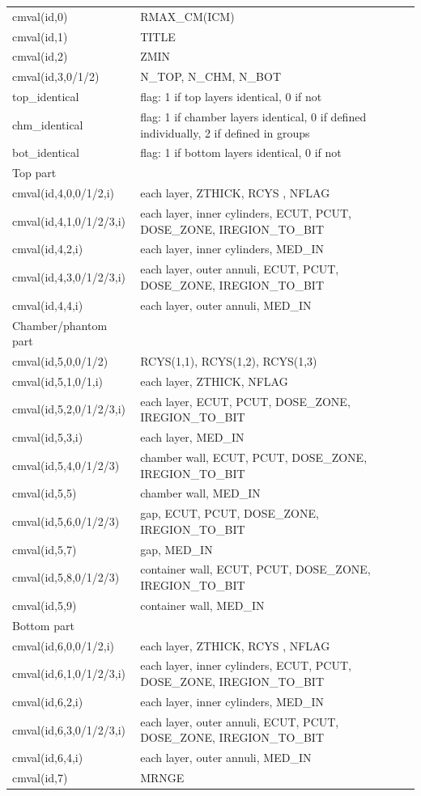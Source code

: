 \documentclass[12pt]{book}
\begin{document}
\begin{tabular}{|p{4.5cm}|p{11.5cm}|}\hline
cmval(id,0) & RMAX\_CM(ICM)\\
cmval(id,1)   & TITLE\\
cmval(id,2)    &ZMIN    \\
cmval(id,3,0/1/2)    &N\_TOP, N\_CHM, N\_BOT \\
top\_identical & flag: 1 if top layers identical, 0 if not\\
chm\_identical & flag: 1 if chamber layers identical, 0 if defined
individually, 2 if defined in groups\\
bot\_identical & flag: 1 if bottom layers identical, 0 if not\\
\hline Top part     & \\ \hline
cmval(id,4,0,0/1/2,i)   &each layer, ZTHICK, RCYS , NFLAG \\
cmval(id,4,1,0/1/2/3,i)   & each layer, inner cylinders,
ECUT, PCUT, DOSE\_ZONE, IREGION\_TO\_BIT\\
cmval(id,4,2,i)   &each layer, inner cylinders, MED\_IN\\
cmval(id,4,3,0/1/2/3,i)   &
each layer, outer annuli, ECUT, PCUT, DOSE\_ZONE, IREGION\_TO\_BIT\\
cmval(id,4,4,i)   &each layer, outer annuli, MED\_IN\\
\hline Chamber/phantom part  & \\ \hline
cmval(id,5,0,0/1/2) &  RCYS(1,1), RCYS(1,2), RCYS(1,3)\\
cmval(id,5,1,0/1,i)   &each layer, ZTHICK, NFLAG\\
cmval(id,5,2,0/1/2/3,i) &
each layer, ECUT, PCUT, DOSE\_ZONE, IREGION\_TO\_BIT\\
cmval(id,5,3,i)   &each layer, MED\_IN \\
cmval(id,5,4,0/1/2/3)   &
chamber wall, ECUT, PCUT, DOSE\_ZONE, IREGION\_TO\_BIT\\
cmval(id,5,5)   &chamber wall, MED\_IN  \\
cmval(id,5,6,0/1/2/3)   & gap, ECUT, PCUT, DOSE\_ZONE, IREGION\_TO\_BIT\\
cmval(id,5,7)   &gap, MED\_IN  \\
cmval(id,5,8,0/1/2/3)   &
container wall, ECUT, PCUT, DOSE\_ZONE, IREGION\_TO\_BIT\\
cmval(id,5,9)   &container wall, MED\_IN\\
\hline Bottom part   & \\ \hline
cmval(id,6,0,0/1/2,i)   &each layer, ZTHICK, RCYS , NFLAG\\
cmval(id,6,1,0/1/2/3,i)   &
each layer, inner cylinders, ECUT, PCUT, DOSE\_ZONE, IREGION\_TO\_BIT\\
cmval(id,6,2,i)   &each layer, inner cylinders, MED\_IN\\
cmval(id,6,3,0/1/2/3,i)   &each layer, outer annuli,
ECUT, PCUT, DOSE\_ZONE, IREGION\_TO\_BIT\\
cmval(id,6,4,i)   &each layer, outer annuli, MED\_IN\\
cmval(id,7)   & MRNGE \\\hline
\end{tabular}
\end{document}

